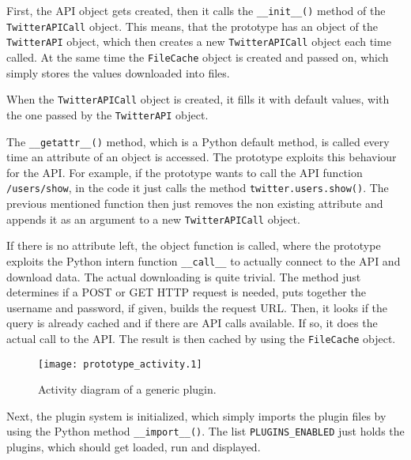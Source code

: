 \lstset{language=python}

First, the API object gets created, then it calls the \texttt{\_\_init\_\_()}
method of the \texttt{TwitterAPICall} object. This means, that the prototype
has an object of the \texttt{TwitterAPI} object, which then creates a new
\texttt{TwitterAPICall} object each time called. At the same time the
\texttt{FileCache} object is created and passed on, which simply stores the
values downloaded into files.

When the \texttt{TwitterAPICall} object is created, it fills it with default
values, with the one passed by the \texttt{TwitterAPI} object.

The \texttt{\_\_getattr\_\_()} method, which is a Python default method, is
called every time an attribute of an object is accessed. The prototype exploits
this behaviour for the \Twitter{} API. For example, if the prototype wants to
call the API function \texttt{/users/show}, in the code it just calls the
method \texttt{twitter.users.show()}. The previous mentioned function then just
removes the non existing attribute and appends it as an argument to a new
\texttt{TwitterAPICall} object.

If there is no attribute left, the object function is called, where the
prototype exploits the Python intern function \texttt{\_\_call\_\_} to actually
connect to the \Twitter{} API and download data. The actual downloading is
quite trivial. The method just determines if a POST or GET HTTP request is
needed, puts together the username and password, if given, builds the request
URL. Then, it looks if the query is already cached and if there are API calls
available. If so, it does the actual call to the \Twitter{} API. The result is
then cached by using the \texttt{FileCache} object.

\begin{figure}[htb]
  \begin{center}
    \texttt{[image: prototype\_activity.1]}
    \caption{Activity diagram of a generic plugin.}
    \label{fig:prototype_activity}
  \end{center}
\end{figure}

Next, the plugin system is initialized, which simply imports the plugin files
by using the Python method \texttt{\_\_import\_\_()}. The list
\texttt{PLUGINS\_ENABLED} just holds the plugins, which should get loaded, run
and displayed.

